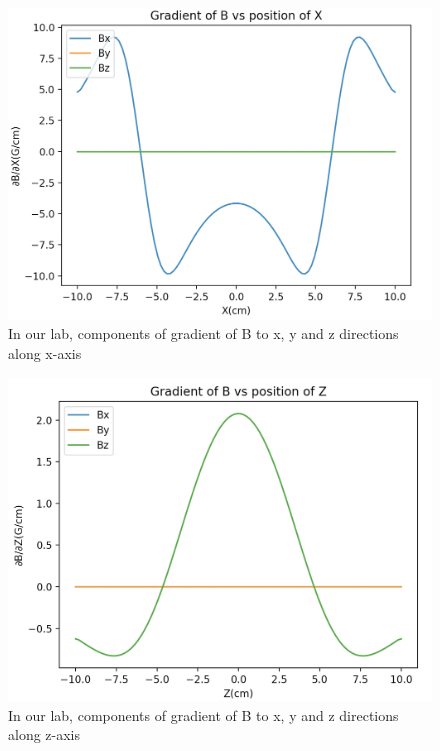 \documentclass{article}
\begin{document}
\begin{figure}[h]
	\centering
	\includegraphics[scale=0.45]{OurGradX}
	\caption{In our lab, components of gradient of B to x, y and z directions along x-axis}
\end{figure}

\begin{figure}[h]
	\centering
	\includegraphics[scale=0.45]{OurGradZ}
	\caption{In our lab, components of gradient of B to x, y and z directions along z-axis}
\end{figure}
\end{document}
